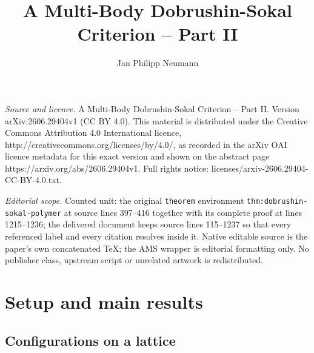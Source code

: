 \documentclass[10pt,a4paper]{amsart}
\begin{document}
\title[A Multi-Body Dobrushin-Sokal Criterion -- Part II]{A Multi-Body Dobrushin-Sokal Criterion -- Part II}
\author{Jan Philipp Neumann}
\date{}
\maketitle
\noindent\emph{Source and licence.} A Multi-Body Dobrushin-Sokal Criterion -- Part II. Version arXiv:2606.29404v1 (CC BY 4.0). This material is distributed under the Creative Commons Attribution 4.0 International licence, http://creativecommons.org/licenses/by/4.0/, as recorded in the arXiv OAI licence metadata for this exact version and shown on the abstract page https://arxiv.org/abs/2606.29404v1. Full rights notice: licenses/arxiv-2606.29404-CC-BY-4.0.txt.\par\smallskip
\noindent\textit{Editorial scope.} Counted unit: the original \texttt{theorem} environment \texttt{thm:dobrushin-sokal-polymer} at source lines 397--416 together with its complete proof at lines 1215--1236; the delivered document keeps source lines 115--1237 so that every referenced label and every citation resolves inside it. Native editable source is the paper's own concatenated TeX; the AMS wrapper is editorial formatting only. No publisher class, upstream script or unrelated artwork is redistributed.
\section{Setup and main results} \label{sec:results}

\subsection{Configurations on a lattice}
\end{document}
